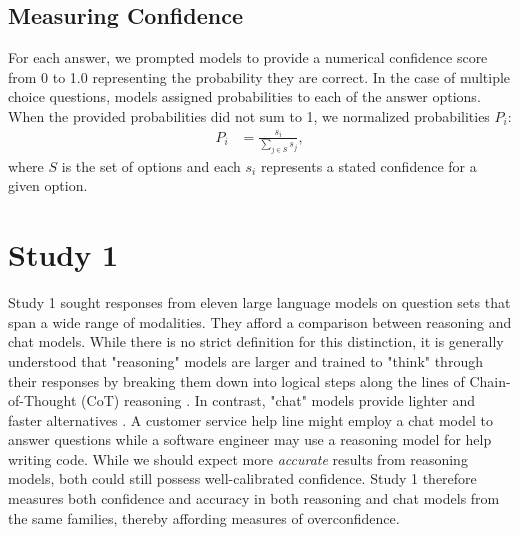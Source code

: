 \documentclass{article}
\begin{document}
\subsection{Measuring Confidence}

For each answer, we prompted models to provide a numerical confidence score from 0 to 1.0 representing the probability they are correct. In the case of multiple choice questions, models assigned probabilities to each of the answer options. When the provided probabilities did not sum to 1, we normalized probabilities $P_i$:
\begin{align}
P_i
&=
\frac{s_i}{\sum_{j\in S}s_j},
\end{align}
where $S$ is the set of options and each $s_i$ represents a stated confidence for a given option.





\section{Study 1} 
Study 1 sought responses from eleven large language models on question sets that span a wide range of modalities. They afford a comparison between reasoning and chat models. While there is no strict definition for this distinction, it is generally understood that "reasoning" models are larger and trained to "think" through their responses by breaking them down into logical steps along the lines of Chain-of-Thought (CoT) reasoning \citep{wu2022promptchainerchaininglargelanguage}. In contrast, "chat" models provide lighter and faster alternatives \citep{reasonVchat}. A customer service help line might employ a chat model to answer questions while a software engineer may use a reasoning model for help writing code. While we should expect more \textit{accurate} results from reasoning models, both could still possess well-calibrated confidence. Study 1 therefore measures both confidence and accuracy in both reasoning and chat models from the same families, thereby affording measures of overconfidence.
\end{document}

